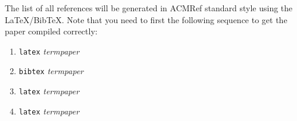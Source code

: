 \documentclass{sig-alternate}
\begin{document}
The list of all references will be generated in ACMRef
standard style using the \LaTeX{}/BibTeX. Note that you
need to first the following sequence to get the paper
compiled correctly:

\begin{enumerate}
\item {\tt latex} {\em termpaper}
\item {\tt bibtex} {\em termpaper}
\item {\tt latex} {\em termpaper}
\item {\tt latex} {\em termpaper}
\end{enumerate}



\balance
\end{document}
